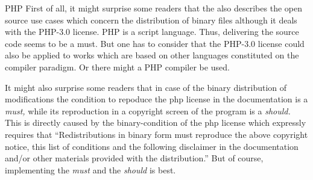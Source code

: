 \begin{license}{PHP}
First of all, it might surprise some readers that the \oslic{} also describes
the open source use cases which concern the distribution of binary files
although it deals with the PHP-3.0 license. PHP is a script language. Thus,
delivering the source code seems to be a must. But one has to consider that the
PHP-3.0 license could also be applied to works which are based on other
languages constituted on the compiler paradigm. Or there might a PHP compiler be
used. 

It might also surprise some readers that in case of the binary distribution of
modifications the condition to repoduce the php license in the documentation is
a \emph{must,} while its reproduction in a copyright screen of the program is a
\emph{should.} This is directly caused by the binary-condition of the php license
which expressly requires that \enquote{Redistributions in binary form must
reproduce the above copyright notice, this list of conditions and the following
disclaimer in the documentation and/or other materials provided with the
distribution.}\citePHP{} But of course, implementing the \emph{must} and the
\emph{should} is best. 

\end{license}

%

